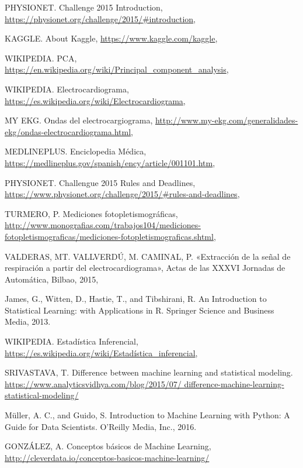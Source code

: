 \begin{thebibliography}{1}
	
	PHYSIONET. Challenge 2015 Introduction,
	\url{https://physionet.org/challenge/2015/#introduction},
	
	KAGGLE. About Kaggle,
	\url{https://www.kaggle.com/kaggle},
	
	WIKIPEDIA. PCA,
	\url{https://en.wikipedia.org/wiki/Principal_component_analysis},
	
	WIKIPEDIA. Electrocardiograma,
	\url{https://es.wikipedia.org/wiki/Electrocardiograma},
	
	MY EKG. Ondas del electrocargiograma,
	\url{http://www.my-ekg.com/generalidades-ekg/ondas-electrocardiograma.html},
	
	MEDLINEPLUS. Enciclopedia Médica,
	\url{https://medlineplus.gov/spanish/ency/article/001101.htm},
	
	PHYSIONET. Challengue 2015 Rules and Deadlines,
	\url{https://www.physionet.org/challenge/2015/#rules-and-deadlines},
	
	TURMERO, P. Mediciones fotopletismográficas,
	\url{http://www.monografias.com/trabajos104/mediciones-fotopletismograficas/mediciones-fotopletismograficas.shtml},
	
	VALDERAS, MT. VALLVERDÚ, M. CAMINAL, P.
	«Extracción de la señal de respiración a partir del
	electrocardiograma», Actas de las XXXVI Jornadas
	de Automática, Bilbao, 2015,
	
	James, G., Witten, D., Hastie, T., and Tibshirani, R. 
	An Introduction to Statistical Learning: with Applications in R. Springer Science and Business Media, 2013.
	
	
	WIKIPEDIA. Estadística Inferencial,
	\url{https://es.wikipedia.org/wiki/Estadística_inferencial},
	
	SRIVASTAVA, T. Difference between machine learning and statistical modeling.
	\url{https://www.analyticsvidhya.com/blog/2015/07/
		difference-machine-learning-statistical-modeling/}
	
	Müller, A. C., and Guido, S. Introduction to Machine Learning with Python:
	A Guide for Data Scientists. O’Reilly Media, Inc., 2016.
	
	GONZÁLEZ, A. Conceptos básicos de Machine Learning,
	\url{http://cleverdata.io/conceptos-basicos-machine-learning/}
	

\end{thebibliography}
